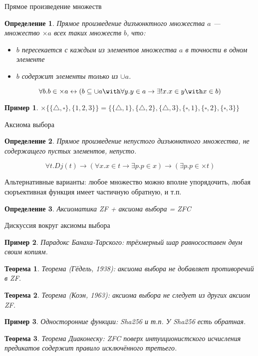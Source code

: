 \documentclass[aspectratio=169]{beamer}
\newtheorem{thm}{Теорема}[section]
\newtheorem{dfn}{Определение}[section]
\newtheorem{exm}{Пример}[section]
\begin{document}
\begin{frame}{Прямое произведение множеств}
\begin{dfn}Прямое произведение дизъюнктного множества $a$ --- 
множество $\times a$ всех таких множеств $b$, что:
\begin{itemize}
\item $b$ пересекается с каждым из элементов множества $a$ в точности в одном элементе
\item $b$ содержит элементы только из $\cup a$.
\end{itemize}

$$\forall b .b \in \times a \leftrightarrow (b \subseteq \cup a \with \forall y .y \in a \rightarrow \exists ! x .x \in y \with x \in b)$$
\end{dfn}\pause

\begin{exm}
$\times\{\{\triangle,\square\},\{1,2,3\}\} = \{\{\triangle,1\},\{\triangle,2\},\{\triangle,3\},\{\square,1\},\{\square,2\},\{\square,3\}\}$
\end{exm}

\end{frame}

\begin{frame}{Аксиома выбора}
\begin{dfn}
Прямое произведение непустого дизъюнктного множества, 
не содержащего пустых элементов, непусто.

$$\forall t.Dj (t) \rightarrow 
(\forall x.x \in t \rightarrow \exists p.p \in x) \rightarrow
(\exists p.p \in \times t)$$
\end{dfn}\pause

Альтернативные варианты: любое множество можно вполне упорядочить, \pause любая сюръективная функция имеет частичную обратную, 
и т.п.
\begin{dfn}Аксиоматика ZF + аксиома выбора = ZFC\end{dfn}\pause
\end{frame}

\begin{frame}{Дискуссия вокруг аксиомы выбора}
\begin{exm}Парадокс Банаха-Тарского: трёхмерный шар равносоставен двум своим копиям.\end{exm}\pause
\begin{thm}Теорема (Гёдель, 1938): аксиома выбора не добавляет противоречий в ZF.\end{thm}\pause
\begin{thm}Теорема (Коэн, 1963): аксиома выбора не следует из других аксиом ZF.\end{thm}\pause
\begin{exm}Односторонние функции: Sha256 и т.п. У Sha256 есть обратная.\end{exm}\pause
\begin{thm}Теорема Диаконеску: ZFC поверх интуиционистского исчисления предикатов содержит правило исключённого третьего.\end{thm}
\end{frame}
\end{document}
